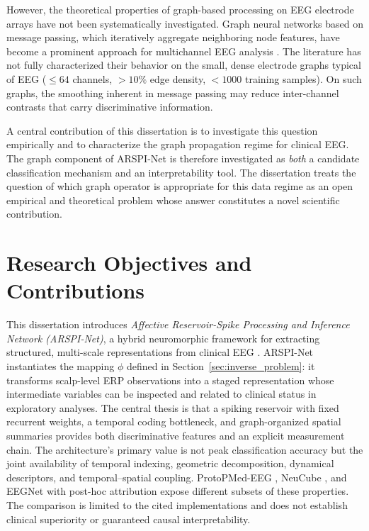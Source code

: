 However, the theoretical properties of graph-based processing on EEG electrode arrays have not been systematically investigated. Graph neural networks based on message passing, which iteratively aggregate neighboring node features, have become a prominent approach for multichannel EEG analysis \cite{Zhong2020EEGEmotionGCN, Song2018EEGEmotionDGCNN}. The literature has not fully characterized their behavior on the small, dense electrode graphs typical of EEG ($\leq 64$ channels, $> 10\%$ edge density, $< 1000$ training samples). On such graphs, the smoothing inherent in message passing may reduce inter-channel contrasts that carry discriminative information.

A central contribution of this dissertation is to investigate this question empirically and to characterize the graph propagation regime for clinical EEG. The graph component of ARSPI-Net is therefore investigated as \emph{both} a candidate classification mechanism and an interpretability tool. The dissertation treats the question of which graph operator is appropriate for this data regime as an open empirical and theoretical problem whose answer constitutes a novel scientific contribution.


\section{Research Objectives and Contributions}

This dissertation introduces \emph{Affective Reservoir-Spike Processing and Inference Network (ARSPI-Net)}, a hybrid neuromorphic framework for extracting structured, multi-scale representations from clinical EEG \cite{lane2023towards, lane2024towards}. ARSPI-Net instantiates the mapping $\phi$ defined in Section~\ref{sec:inverse_problem}: it transforms scalp-level ERP observations into a staged representation whose intermediate variables can be inspected and related to clinical status in exploratory analyses. The central thesis is that a spiking reservoir with fixed recurrent weights, a temporal coding bottleneck, and graph-organized spatial summaries provides both discriminative features and an explicit measurement chain. The architecture's primary value is not peak classification accuracy but the joint availability of temporal indexing, geometric decomposition, dynamical descriptors, and temporal--spatial coupling. ProtoPMed-EEG \cite{barnett_protopmed_2024}, NeuCube \cite{kasabov_neucube_2014}, and EEGNet with post-hoc attribution expose different subsets of these properties. The comparison is limited to the cited implementations and does not establish clinical superiority or guaranteed causal interpretability.


